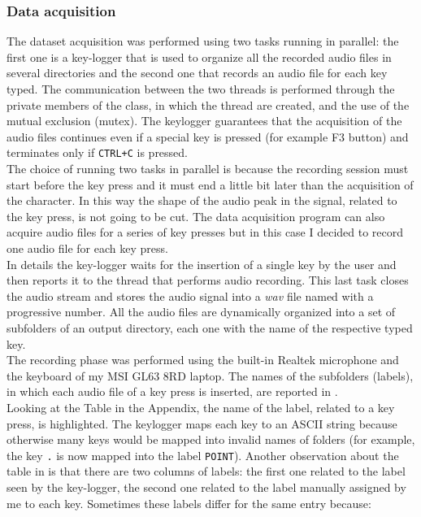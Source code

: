 \subsubsection{Data acquisition}
The dataset acquisition was performed using two tasks running in parallel: the first one is a key-logger that is used to organize all the recorded audio files in several directories and the second one that records an audio file for each key typed. The communication between the two threads is performed through the private members of the class, in which the thread are created, and the use of the mutual exclusion (mutex). The keylogger guarantees that the acquisition of the audio files continues even if a special key is pressed (for example F3 button) and terminates only if \texttt{CTRL+C} is pressed.\\
The choice of running two tasks in parallel is because the recording session must start before the key press and it must end a little bit later than the acquisition of the character. In this way the shape of the audio peak in the signal, related to the key press, is not going to be cut. The data acquisition program can also acquire audio files for a series of key presses but in this case I decided to record one audio file for each key press.\\
In details the key-logger waits for the insertion of a single key by the user and then reports it to the thread that performs audio recording. This last task closes the audio stream and stores the audio signal into a \textit{wav} file named with a progressive number. All the audio files are dynamically organized into a set of subfolders of an output directory, each one with the name of the respective typed key.\\
The recording phase was performed using the built-in Realtek microphone and the keyboard of my MSI GL63 8RD laptop. The names of the subfolders (labels), in which each audio file of a key press is inserted, are reported in .\\
Looking at the Table in the Appendix, the name of the label, related to a key press, is highlighted. The keylogger maps each key to an ASCII string because otherwise many keys would be mapped into invalid names of folders (for example, the key \texttt{.} is now mapped into the label \texttt{POINT}). Another observation about the table in  is that there are two columns of labels: the first one related to the label seen by the key-logger, the second one related to the label manually assigned by me to each key. Sometimes these labels differ for the same entry because:
